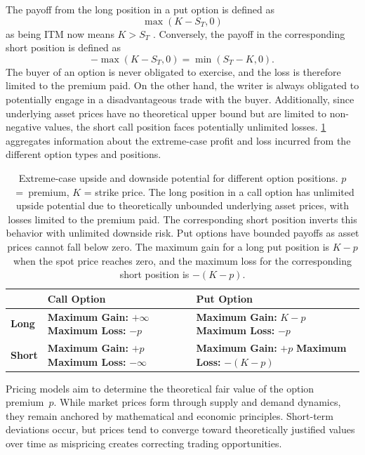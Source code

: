 \documentclass[english,12pt,a4paper,pdftex,sci,utf8]{aaltothesis}
\begin{document}
The payoff from the long position in a put option is defined as
\begin{equation}
    \max(K-S_T,0)
\label{eq:long_put_payoff}
\end{equation}
as being ITM now means $K > S_T$ \cite{hull2018}. Conversely, the payoff in the corresponding short position is defined as
\begin{equation*}
    -\max(K-S_T,0) = \min(S_T-K,0).
\end{equation*}
The buyer of an option is never obligated to exercise, and the loss is therefore limited to the premium paid. On the other hand, the writer is always obligated to potentially engage in a disadvantageous trade with the buyer. Additionally, since underlying asset prices have no theoretical upper bound but are limited to non-negative values, the short call position faces potentially unlimited losses. \cref{tab:options_table} aggregates information about the extreme-case profit and loss incurred from the different option types and positions.

\begin{table}[!htb]
\centering
\caption{Extreme-case upside and downside potential for different option positions. \mbox{$p$ = premium}, $K$ = strike price. The long position in a call option has unlimited upside potential due to theoretically unbounded underlying asset prices, with losses limited to the premium paid. The corresponding short position inverts this behavior with unlimited downside risk. Put options have bounded payoffs as asset prices cannot fall below zero. The maximum gain for a long put position is $K-p$ when the spot price reaches zero, and the maximum loss for the corresponding short position is $-(K-p)$.}\label{tab:options_table}
\begin{tabular}{|l|p{5cm}|p{5cm}|}
\hline
\textbf{} & \textbf{Call Option} & \textbf{Put Option} \\
\hline
\textbf{Long} & \textbf{Maximum Gain:} $+\infty$
\newline \textbf{Maximum Loss:} $-p$ & \textbf{Maximum Gain:} $K-p$
\newline \textbf{Maximum Loss:} $-p$ \\
\hline
\textbf{Short} & \textbf{Maximum Gain:} $+p$
\newline \textbf{Maximum Loss:} $-\infty$ & \textbf{Maximum Gain:} $+p$
\newline \textbf{Maximum Loss:} $-(K-p)$ \\
\hline
\end{tabular}
\end{table}
Pricing models aim to determine the theoretical fair value of the option \mbox{premium $p$.} While market prices form through supply and demand dynamics, they remain anchored by mathematical and economic principles. Short-term deviations occur, but prices tend to converge toward theoretically justified values over time as mispricing creates correcting trading opportunities.
\clearpage
\end{document}
